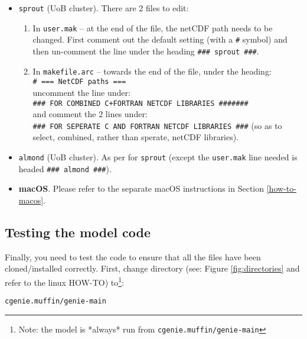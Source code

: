 \documentclass[11pt,fleqn]{book} %
\begin{document}
\begin{itemize}
\vspace{1mm}
\item \texttt{sprout} (UoB cluster). There are 2 files to edit:
\begin{enumerate}[noitemsep]
\item In \texttt{user.mak} -- at the end of the file, the netCDF path needs to be changed. First comment out the default setting (with a \texttt{\#} symbol) and then un-comment the line under the heading \texttt{\#\#\# sprout \#\#\#}.
\item In \texttt{makefile.arc} -- towards the end of the file, under the heading:
\\\texttt{\# === NetCDF paths ===}
\\uncomment the line under:
\\\texttt{\#\#\# FOR COMBINED C+FORTRAN NETCDF LIBRARIES \#\#\#\#\#\#\#}
\\and comment the 2 lines under:
\\\texttt{\#\#\# FOR SEPERATE C AND FORTRAN NETCDF LIBRARIES \#\#\#}
(so as to select, combined, rather than sperate, netCDF libraries). 
\end{enumerate}

\vspace{1mm}
\item \texttt{almond} (UoB cluster). As per for \texttt{sprout} (except the \texttt{user.mak} line needed is headed \texttt{\#\#\# almond \#\#\#}).

\vspace{1mm}
\item \textbf{macOS}. Please refer to the separate macOS instructions in Section \ref{how-to-macos}.

\end{itemize}


\subsection{Testing the model code}

\noindent Finally, you need to test the code to ensure that all the files have been cloned/installed correctly.
 First, change directory (see: Figure \ref{fig:directories} and refer to the linux HOW-TO) to\footnote{Note: the model is *always* run from \texttt{cgenie.muffin/genie-main}}:

\vspace{-2mm}
\begin{verbatim}
cgenie.muffin/genie-main
\end{verbatim}
\vspace{-2mm}
\end{document}

